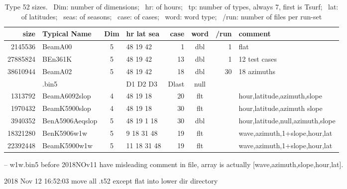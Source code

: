 \documentclass{article}
\begin{document}
\begin{table} [!h]
\caption[Type 52 sizes]{Type 52 sizes. \  Dim: number of dimensions; \ hr: of hours;  \ tp: number of types, always 7, first is Tsurf; \ lat: of latitudes; \ seas: of seasons; \ case: of cases; \ word: word type; \ /run: number of files per run-set}
\begin{center}
\begin{tabular}{| r l c |  l r c r | l | } \hline \hline
size     & Typical Name & Dim & hr lat sea & case & word & /run & comment \\ \hline
 2145536 & BeamA00 & 5   & 48 19 42    & 1  & dbl &  1  & flat \\
27885824 & BEn361K & 5   & 48 19 42    & 13 & dbl &  1  & 12 test cases \\
38610944 & BeamA02 & 5   & 48 19 42    & 18 & dbl &  30 & 18 azimuths \\ \hline
 & .bin5 &  & D1 D2 D3 & Dlast & null& \\ \hline
1313792 & BeamA6092slop &  4 & 48 19 18 & 20 & flt & & hour,latitude,azimuth,slope \\
1970432 & BeamK5900slop &  4 & 48 19 18 & 30 & flt & &  hour,latitude,azimuth slope \\
3940352 & BenA5906Aeqslop & 5 & 48 19 1 18 & 30 & dbl & & hour,latitude,null,azimuth,slope \\
18321280 & BenK5906w1w  &  5 &  9 18 31 48 & 19 & flt & & wave,azimuth,1+slope,hour,lat \\
22392448 & BeamK5900w1w &  5 & 11 18 31 48 & 19 & flt & & wave,azimuth,1+slope,hour,lat \\ \hline
\end{tabular} \end{center} \end{table}
-- w1w.bin5 before 2018NOv11 have misleading comment in file, array is actually [wave,azimuth,slope,hour,lat].

2018 Nov 12 16:52:03 move all .t52 except flat into lower dir directory
 
\end{document}
